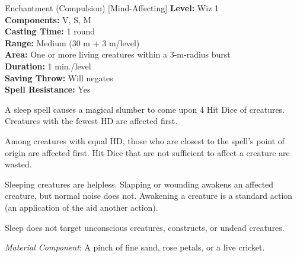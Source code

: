 {Enchantment (Compulsion) [Mind-Affecting]}
{
	\textbf{Level:}
	Wiz 1\\
	\textbf{Components:}
	V, S, M\\
	\textbf{Casting Time:}
	1 round\\
	\textbf{Range:}
	Medium (30 m + 3 m/level)\\
	\textbf{Area:}
	One or more living creatures within a 3-m-radius burst\\
	\textbf{Duration:}
	1 min./level\\
	\textbf{Saving Throw:}
	Will negates\\
	\textbf{Spell Resistance:}
	Yes\\
}
{
	A sleep spell causes a magical slumber to come upon 4 Hit Dice of creatures. Creatures with the fewest HD are affected first.

	Among creatures with equal HD, those who are closest to the spell's point of origin are affected first. Hit Dice that are not sufficient to affect a creature are wasted.

	Sleeping creatures are helpless. Slapping or wounding awakens an affected creature, but normal noise does not. Awakening a creature is a standard action (an application of the aid another action).

	Sleep does not target unconscious creatures, constructs, or undead creatures.

	\textit{Material Component}:
	A pinch of fine sand, rose petals, or a live cricket.

}
